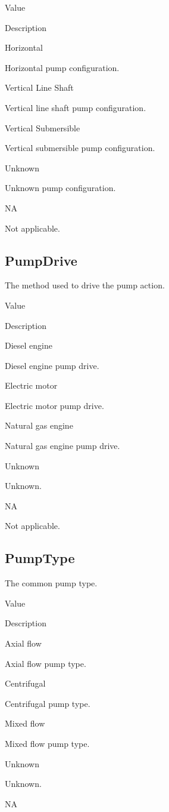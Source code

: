 \documentclass[
  letterpaper,
  DIV=11,
  numbers=noendperiod]{scrreprt}
\begin{document}
Value

Description

Horizontal

Horizontal pump configuration.

Vertical Line Shaft

Vertical line shaft pump configuration.

Vertical Submersible

Vertical submersible pump configuration.

Unknown

Unknown pump configuration.

NA

Not applicable.

\subsection{PumpDrive}\label{pumpdrive}

The method used to drive the pump action.

Value

Description

Diesel engine

Diesel engine pump drive.

Electric motor

Electric motor pump drive.

Natural gas engine

Natural gas engine pump drive.

Unknown

Unknown.

NA

Not applicable.

\subsection{PumpType}\label{pumptype}

The common pump type.

Value

Description

Axial flow

Axial flow pump type.

Centrifugal

Centrifugal pump type.

Mixed flow

Mixed flow pump type.

Unknown

Unknown.

NA
\end{document}
